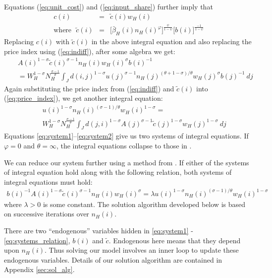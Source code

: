 \documentclass[12 pt]{article}
\begin{document}
Equations (\ref{eq:unit_cost}) and (\ref{eq:input_share}) further imply that 
\begin{eqnarray}\label{eq:ctilde}
	c(i) & = & \tilde{c}(i) w_H(i) \nonumber \\
    \mbox{where}~~~ \tilde{c}(i) & = & 
	\Big[\bar{\beta}_H(i) n_H(i)^{\varphi}\Big] ^{\frac{\psi}{1-\psi}} \Big[b(i)\Big]^{\frac{-1}{1-\psi}}
\end{eqnarray}
Replacing $c(i)$ with $\tilde{c}(i)$ in the above integral equation and also replacing the price index using (\ref{eq:indiff}), after some algebra we get:
\begin{eqnarray}\label{eq:system1}
	& & A(i)^{1-\sigma} \tilde{c}(i)^{\sigma-1} n_H(i)  w_H(i)^{\sigma}  b(i)^{-1}  \nonumber \\
	& & =  
    W_H^{1-\sigma} N_H^{\frac{\sigma-1}{\theta}}
    \int_J d(i,j)^{1-\sigma} u(j)^{\sigma-1} n_H(j)^{(\theta+1-\sigma)/\theta} w_H(j)^{\sigma} b(j)^{-1}  ~dj
\end{eqnarray}
Again substituting the price index from (\ref{eq:indiff}) and $\tilde{c}(i)$ into (\ref{eq:price_index}), we get another integral equation: 
\begin{eqnarray}\label{eq:system2}
 	& &  u(i)^{1-\sigma} n_H(i)^{(\sigma-1)/\theta} w_H(i)^{1-\sigma}  = \nonumber \\ 
 	& & 
    W_H^{1-\sigma} N_H^{\frac{\sigma-1}{\theta}}
 	\int_J  d(j,i)^{1-\sigma} A(j)^{\sigma-1}  \tilde{c}(j)^{1-\sigma} w_H(j)^{1-\sigma}
 	~ dj
\end{eqnarray}
Equations \ref{eq:system1}--\ref{eq:system2} give us two systems of integral equations. If $\varphi=0$ and $\theta=\infty$, the integral equations collapse to those in \citet{allen2014trade}. 

We can reduce our system further using a method from \citet{allen2014trade}.  If either of the systems of integral equation hold along with the following relation, both systems of integral equations must hold:
\begin{eqnarray}\label{eq:systems_relation}
	  b(i)^{-1}  A(i)^{1-\sigma} \tilde{c}(i)^{\sigma-1} n_H(i)  w_H(i)^{\sigma} = \lambda  u(i)^{1-\sigma} n_H(i)^{(\sigma-1)/\theta} w_H(i)^{1-\sigma}
\end{eqnarray}
where $\lambda > 0$ is some constant.  The solution algorithm developed below is based on successive iterations over  $n_H(i)$.

There are two ``endogenous'' variables hidden in \eqref{eq:system1} - \eqref{eq:systems_relation}, $b(i)$ and $\tilde{c}$. Endogenous here means that they depend upon $n_H(i)$.  Thus solving our model involves an inner loop to update these endogenous variables.  Details of our solution algorithm are contained in Appendix \ref{sec:sol_alg}.
\end{document}
